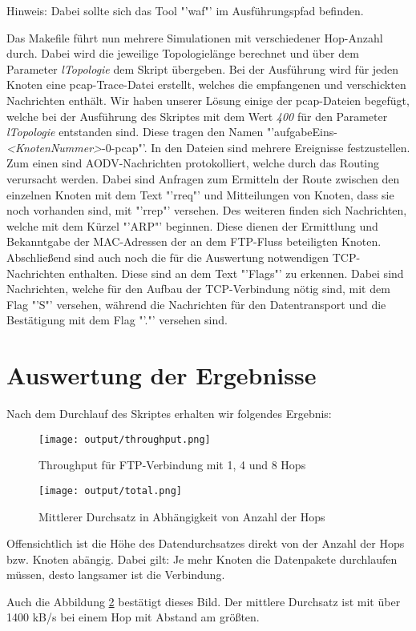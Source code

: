 \documentclass[12pt,a4paper,titlepage]{article}
\begin{document}
\begin{center}
Hinweis: Dabei sollte sich das Tool "'waf"' im Ausführungspfad befinden.
\end{center}

Das Makefile führt nun mehrere Simulationen mit verschiedener Hop-Anzahl durch. Dabei wird die jeweilige Topologielänge berechnet und über dem Parameter \textit{lTopologie} dem Skript übergeben. Bei der Ausführung wird für jeden Knoten eine pcap-Trace-Datei erstellt, welches die empfangenen und verschickten Nachrichten enthält. Wir haben unserer Lösung einige der pcap-Dateien begefügt, welche bei der Ausführung des Skriptes mit dem Wert \textit{400} für den Parameter \textit{lTopologie} entstanden sind. Diese tragen den Namen "'aufgabeEins-\textit{\textless KnotenNummer\textgreater}-0-pcap"'. 
In den Dateien sind mehrere Ereignisse festzustellen. Zum einen sind AODV-Nachrichten protokolliert, welche durch das Routing verursacht werden. Dabei sind Anfragen zum Ermitteln der Route zwischen den einzelnen Knoten mit dem Text "'rreq"'  und Mitteilungen von Knoten, dass sie noch vorhanden sind, mit "'rrep"' versehen. 
Des weiteren finden sich Nachrichten, welche mit dem Kürzel "'ARP"' beginnen. Diese dienen der Ermittlung und Bekanntgabe der MAC-Adressen der an dem FTP-Fluss beteiligten Knoten. Abschließend sind auch noch die für die Auswertung notwendigen TCP-Nachrichten enthalten. Diese sind an dem Text "'Flags"' zu erkennen. Dabei sind Nachrichten, welche für den Aufbau der TCP-Verbindung nötig sind, mit dem Flag "'S"' versehen, während die Nachrichten für den Datentransport und die Bestätigung mit dem Flag "'."' versehen sind.


\section{Auswertung der Ergebnisse}

Nach dem Durchlauf des Skriptes erhalten wir folgendes Ergebnis:

\begin{figure}[h]
	\centering
% 	
	\texttt{[image: output/throughput.png]}
	\caption{Throughput für FTP-Verbindung mit 1, 4 und 8 Hops}
	\label{Durchsatz}
\end{figure}

\begin{figure}[h]
	\centering
% 	
	\texttt{[image: output/total.png]}
	\caption{Mittlerer Durchsatz in Abhängigkeit von Anzahl der Hops}
	\label{Durchsatz2}
\end{figure}

Offensichtlich ist die Höhe des Datendurchsatzes direkt von der Anzahl der Hops bzw. Knoten abängig. Dabei gilt: Je mehr Knoten die Datenpakete durchlaufen müssen, desto langsamer ist die Verbindung.

Auch die Abbildung \ref{Durchsatz2} bestätigt dieses Bild. Der mittlere Durchsatz ist mit über 1400 kB/s bei einem Hop mit Abstand am größten.
\end{document}
